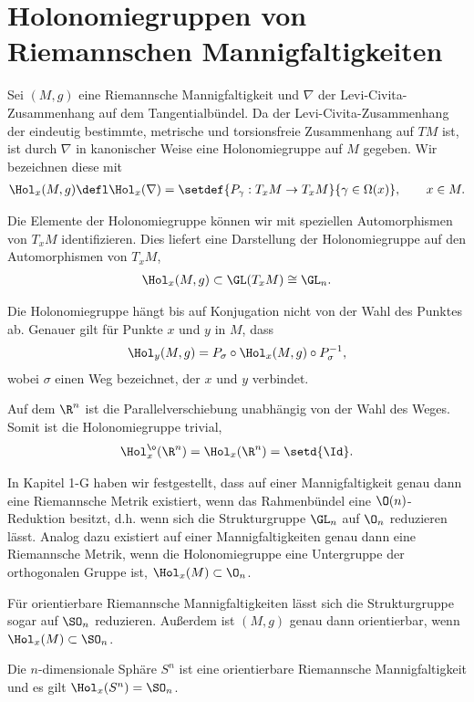 \documentclass[%
	paper=a5,%
	fleqn,%
	DIV=18,%
	BCOR=0mm,
	fontsize=11pt,
	titlepage=false,%
	bibliography=totoc,
	DIV=18,%
	twoside=true,
	pdftitle=Riemannsche Geometrie,
	pdfauthor=Uwe Semmelmann,
	numbers=noendperiod]%
	{scrbook}
\begin{document}
\section{Holonomiegruppen von Riemannschen Mannigfaltigkeiten}

Sei $(M,g)$ eine Riemannsche Mannigfaltigkeit und $\nabla$ der Levi-Civita-Zusammenhang auf dem Tangentialbündel. Da der Levi-Civita-Zusammenhang der eindeutig bestimmte, metrische und torsionsfreie Zusammenhang auf $TM$ ist, ist durch $\nabla$ in kanonischer Weise eine Holonomiegruppe auf $M$ gegeben. Wir bezeichnen diese mit
\begin{align*}
\Hol_{x}(M,g) \defl \Hol_{x}(\nabla) = 
\setdef{P_{\gamma} : T_{x}M\to T_{x}M}{\gamma\in\Omega(x)},\qquad x\in M.
\end{align*}

Die Elemente der Holonomiegruppe können wir mit speziellen Automorphismen von $T_{x}M$ identifizieren. Dies liefert eine Darstellung der Holonomiegruppe auf den Automorphismen von $T_{x}M$,
\begin{align*}
\Hol_{x}(M,g) \subset \GL(T_{x}M) \cong \GL_{n}.
\end{align*}

\begin{rem}
Die Holonomiegruppe hängt bis auf Konjugation nicht von der Wahl des Punktes ab. Genauer gilt für Punkte $x$ und $y$ in $M$, dass
\begin{align*}
\Hol_{y}(M,g) = P_{\sigma}\circ \Hol_{x}(M,g) \circ P_{\sigma}^{-1},
\end{align*}
wobei $\sigma$ einen Weg bezeichnet, der $x$ und $y$ verbindet.\map
\end{rem}

\begin{ex}
\begin{exenum}
 \item Auf dem $\R^n$ ist die Parallelverschiebung unabhängig von der Wahl des Weges. Somit ist die Holonomiegruppe trivial,
 \begin{align*}
\Hol_{x}^\o(\R^n) = \Hol_{x}(\R^n) = \setd{\Id}.
\end{align*}
\item In Kapitel 1-G haben wir festgestellt, dass auf einer Mannigfaltigkeit genau dann eine Riemannsche Metrik existiert, wenn das Rahmenbündel eine $\O(n)$-Reduktion besitzt, d.h. wenn sich die Strukturgruppe $\GL_{n}$ auf $\O_{n}$ reduzieren lässt. Analog dazu existiert auf einer Mannigfaltigkeiten genau dann eine Riemannsche Metrik, wenn die Holonomiegruppe eine Untergruppe der orthogonalen Gruppe ist, $\Hol_{x}(M) \subset \O_{n}$.

Für orientierbare Riemannsche Mannigfaltigkeiten lässt sich die Strukturgruppe sogar auf $\SO_{n}$ reduzieren. Außerdem ist $(M,g)$ genau dann orientierbar, wenn $\Hol_{x}(M)\subset \SO_{n}$.
\item Die $n$-dimensionale Sphäre $S^n$ ist eine orientierbare Riemannsche Mannigfaltigkeit und es gilt $\Hol_{x}(S^n) = \SO_{n}$.\bsp
\end{exenum}
\end{ex}
\end{document}
